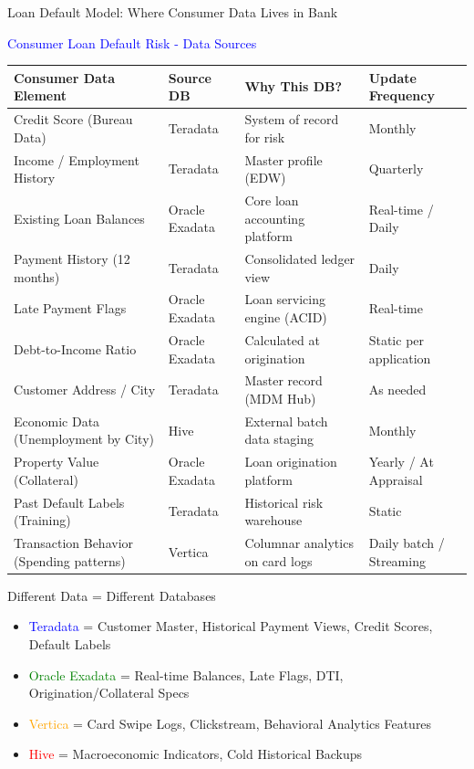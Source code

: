 \documentclass{beamer}
\begin{document}
\begin{frame}{Loan Default Model: Where Consumer Data Lives in Bank}
	\begin{center}
		\textcolor{blue}{\large Consumer Loan Default Risk - Data Sources}
	\end{center}
	
	\begin{table}
		\tiny
		\begin{tabular}{|p{}|p{}|p{}|p{}|}
			\hline
			\textbf{Consumer Data Element} & \textbf{Source DB} & \textbf{Why This DB?} & \textbf{Update Frequency} \\
			\hline
			Credit Score (Bureau Data) & Teradata & System of record for risk & Monthly \\
			\hline
			Income / Employment History & Teradata & Master profile (EDW) & Quarterly \\
			\hline
			Existing Loan Balances & Oracle Exadata & Core loan accounting platform & Real-time / Daily \\
			\hline
			Payment History (12 months) & Teradata & Consolidated ledger view & Daily \\
			\hline
			Late Payment Flags & Oracle Exadata & Loan servicing engine (ACID) & Real-time \\
			\hline
			Debt-to-Income Ratio & Oracle Exadata & Calculated at origination & Static per application \\
			\hline
			Customer Address / City & Teradata & Master record (MDM Hub) & As needed \\
			\hline
			Economic Data (Unemployment by City) & Hive & External batch data staging & Monthly \\
			\hline
			Property Value (Collateral) & Oracle Exadata & Loan origination platform & Yearly / At Appraisal \\
			\hline
			Past Default Labels (Training) & Teradata & Historical risk warehouse & Static \\
			\hline
			Transaction Behavior (Spending patterns) & Vertica & Columnar analytics on card logs & Daily batch / Streaming \\
			\hline
		\end{tabular}
	\end{table}
	
	\begin{block}{Different Data = Different Databases}
		\tiny
		\begin{itemize}
			\item \textcolor{blue}{Teradata} = Customer Master, Historical Payment Views, Credit Scores, Default Labels
			\item \textcolor{green}{Oracle Exadata} = Real-time Balances, Late Flags, DTI, Origination/Collateral Specs
			\item \textcolor{orange}{Vertica} = Card Swipe Logs, Clickstream, Behavioral Analytics Features
			\item \textcolor{red}{Hive} = Macroeconomic Indicators, Cold Historical Backups
		\end{itemize}
	\end{block}
	

\end{frame}
\end{document}

